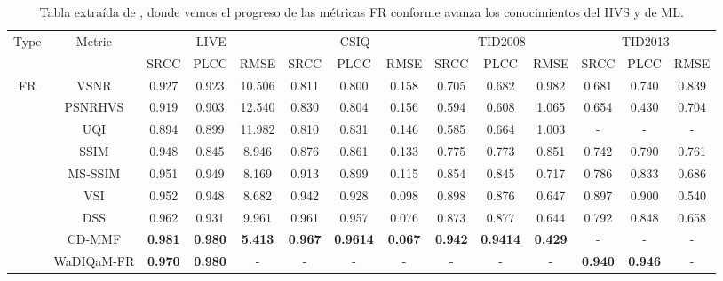 \begin{table}[htp]
  \tiny
  \hspace{-1.8cm}
  \begin{tabular}{|c|c|c|c|c|c|c|c|c|c|c|c|c|c|}
    \hline
    \multirow{2}{*}{Type} & \multirow{2}{*}{Metric} & \multicolumn{3}{c|}{LIVE}& \multicolumn{3}{c|}{CSIQ} & \multicolumn{3}{c|}{TID2008} & \multicolumn{3}{c|}{TID2013} \\
    \cline{3-14}
                          & & SRCC & PLCC & RMSE & SRCC & PLCC & RMSE & SRCC & PLCC & RMSE & SRCC & PLCC & RMSE \\
    \hline
    \multirow{10}{*}{FR}
                   & VSNR\cite{VSNR} & 0.927 & 0.923 & 10.506 & 0.811 & 0.800 & 0.158 & 0.705 & 0.682 & 0.982 & 0.681 & 0.740 & 0.839 \\
                   & PSNRHVS\cite{PSNR-HVS} & 0.919 & 0.903 & 12.540 & 0.830 & 0.804 & 0.156 & 0.594 & 0.608 & 1.065 & 0.654 & 0.430 & 0.704 \\
                   & UQI\cite{UQI} & 0.894 & 0.899 & 11.982 & 0.810 & 0.831 & 0.146 & 0.585 & 0.664 & 1.003 & - & - & -\\
                   & SSIM\cite{SSIM} & 0.948 & 0.845 & 8.946 & 0.876 & 0.861 & 0.133 & 0.775 & 0.773 & 0.851 & 0.742 & 0.790 & 0.761\\ 
                   & MS-SSIM\cite{MS-SSIM} & 0.951 & 0.949 & 8.169 & 0.913 & 0.899 & 0.115 & 0.854 & 0.845 & 0.717 & 0.786 & 0.833 & 0.686\\
                   & VSI\cite{VSI} & 0.952 & 0.948 & 8.682 & 0.942 & 0.928 & 0.098 & 0.898 & 0.876 & 0.647 & 0.897 & 0.900 & 0.540\\
                   & DSS\cite{DSS} & 0.962 & 0.931 & 9.961 & 0.961 & 0.957 & 0.076 & 0.873 & 0.877 & 0.644 & 0.792 & 0.848 & 0.658\\
                   & CD-MMF\cite{MMF} & \textbf{0.981} & \textbf{0.980} & \textbf{5.413} & \textbf{0.967} & \textbf{0.9614} & \textbf{0.067} & \textbf{0.942} & \textbf{0.9414} & \textbf{0.429} & - & - & -\\
                   & WaDIQaM-FR\cite{DIQaM} & \textbf{0.970} & \textbf{0.980} & - & - & - & - & - & - & - & \textbf{0.940} & \textbf{0.946} & -\\
                  \hline 
  \end{tabular}
  \caption[Tablas estado del arte FR-IQA]{Tabla extraída de \cite{SurveyOf2D3DMetrics}, 
    donde vemos el progreso de las métricas FR conforme avanza los conocimientos
  del HVS y de ML.}
    \label{tab:SOTAFRIQA}
\end{table}

